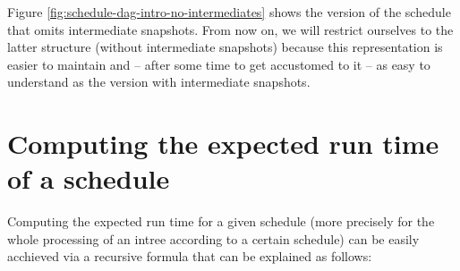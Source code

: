Figure \ref{fig:schedule-dag-intro-no-intermediates} shows the version of the schedule that omits intermediate snapshots. From now on, we will restrict ourselves to the latter structure (without intermediate snapshots) because this representation is easier to maintain and -- after some time to get accustomed to it -- as easy to understand as the version with intermediate snapshots.

\section{Computing the expected run time of a schedule}
\label{sec:introduction-compute-expected-time-schedule}

Computing the expected run time for a given schedule (more precisely for the whole processing of an intree according to a certain schedule) can be easily acchieved via a recursive formula that can be explained as follows:

